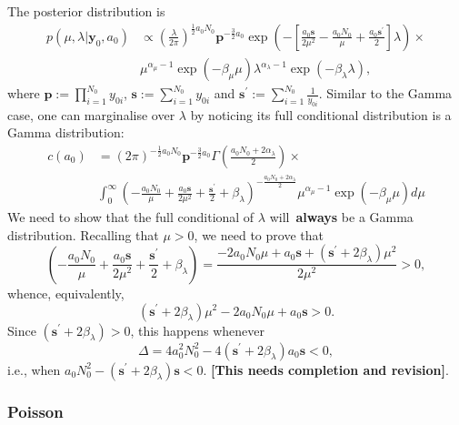 \documentclass[a4paper, notitlepage, 11pt]{article}
\begin{document}
The posterior distribution is
\begin{align}
  \nonumber
 p(\mu, \lambda | \boldsymbol y_0, a_0) &\propto \left(\frac{\lambda}{2\pi}\right)^{\frac{1}{2}a_0N_0} \boldsymbol p^{-\frac{3}{2} a_0} \exp\left( -\left[ \frac{a_0\boldsymbol s}{2\mu^2} -\frac{a_0N_0}{\mu} + \frac{a_0 \boldsymbol s^\prime}{2} \right]\lambda\right) \times \\
 \label{eq:posterior_invGauss}
 &\mu^{\alpha_\mu-1}\exp(-\beta_\mu \mu) \lambda^{\alpha_\lambda -1} \exp(-\beta_\lambda  \lambda),
\end{align}
where  $\boldsymbol p := \prod_{i =1}^{N_0} y_{0i}$,  $\boldsymbol s := \sum_{i =1}^{N_0} y_{0i}$ and $\boldsymbol s^\prime := \sum_{i =1}^{N_0} \frac{1}{y_{0i}}$.
Similar to the Gamma case, one can marginalise over $\lambda$ by noticing its full conditional distribution is a Gamma distribution:
\begin{align}
 \nonumber
 c(a_0) &= (2\pi)^{-\frac{1}{2}a_0N_0} \boldsymbol p^{-\frac{3}{2} a_0} \Gamma\left( \frac{a_0N_0 + 2\alpha_\lambda}{2} \right) \times \\
 \label{eq:cA0_invGaussian}
 & \int_0^\infty \left( -\frac{a_0N_0}{\mu} + \frac{a_0\boldsymbol s }{2\mu^2} + \frac{\boldsymbol s^\prime}{2} + \beta_\lambda \right)^{-\frac{a_0N_0 + 2\alpha_\lambda}{2}} \mu^{\alpha_\mu-1}\exp(-\beta_\mu \mu) d\mu
\end{align}
We need to show that the full conditional of $\lambda$ will~\textbf{always} be a Gamma distribution.
Recalling that $\mu > 0$, we need to prove that 
\[ \left( -\frac{a_0N_0}{\mu} + \frac{a_0\boldsymbol s }{2\mu^2} + \frac{\boldsymbol s^\prime}{2} + \beta_\lambda \right) = \frac{-2a_0N_0\mu + a_0\boldsymbol s + (\boldsymbol s^\prime + 2\beta_\lambda)\mu^2 }{2\mu^2} > 0,\]
whence, equivalently,
\[ (\boldsymbol s^\prime + 2\beta_\lambda)\mu^2 -2a_0N_0\mu + a_0\boldsymbol s > 0. \]
Since $(\boldsymbol s^\prime + 2\beta_\lambda) > 0$, this happens whenever
\[ \Delta  =  4a_0^2N_0^2 - 4(\boldsymbol s^\prime + 2\beta_\lambda) a_0\boldsymbol s < 0, \]
i.e., when $a_0N_0^2 -(\boldsymbol s^\prime + 2\beta_\lambda)\boldsymbol s < 0$.
\textbf{[This needs completion and revision]}.

\subsubsection*{Poisson}
\end{document}
